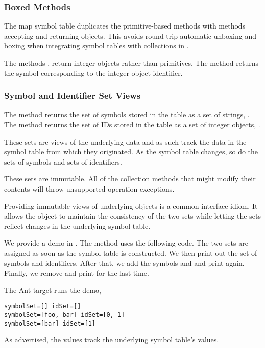 \subsubsection{Boxed Methods}

The map symbol table duplicates the primitive-based 
methods with methods accepting and returning  objects.
This avoids round trip automatic unboxing and boxing when integrating
symbol tables with collections in .  

The methods ,
 return integer objects rather than
primitives.  The method  returns the symbol
corresponding to the integer object identifier.


\subsubsection{Symbol and Identifier Set Views}

The method  returns the set of symbols stored in the
table as a set of strings, .  The method
 returns the set of IDs stored in the table as a set of
integer objects, .  

These sets are views of the underlying data and as such track the data
in the symbol table from which they originated.  As the symbol table
changes, so do the sets of symbols and sets of identifiers.  

These sets are immutable.  All of the collection methods that might
modify their contents will throw unsupported operation exceptions.

Providing immutable views of underlying objects is a common interface
idiom.  It allows the object to maintain the consistency of the two
sets while letting the sets reflect changes in the underlying symbol
table.

We provide a demo in .  The  method
uses the following code.
%
%
The two sets are assigned as soon as the symbol table is constructed.
We then print out the set of symbols and identifiers.  After that, we
add the symbols  and  and print again.  
Finally, we remove  and print for the last time.

The Ant target  runs the demo,
%
\vspace*{2pt} %
\begin{verbatim}
symbolSet=[] idSet=[]
symbolSet=[foo, bar] idSet=[0, 1]
symbolSet=[bar] idSet=[1]
\end{verbatim}
%
As advertised, the values track the underlying symbol table's values.


